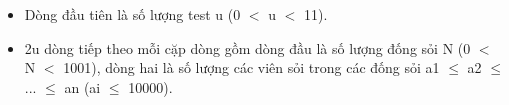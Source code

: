 \begin{itemize}
	\item     Dòng đầu tiên là số lượng test u (0 $<$ u $<$ 11).   
	\item     2u dòng tiếp theo mỗi cặp dòng gồm dòng đầu là số lượng đống sỏi N (0 $<$ N $<$ 1001), dòng hai là số lượng các viên sỏi trong các đống sỏi a1  $\le$  a2  $\le$  ...  $\le$  an (ai  $\le$  10000).   
\end{itemize}

\